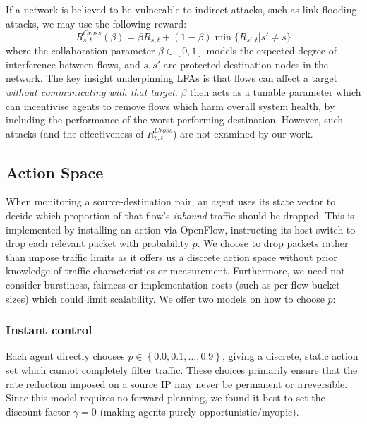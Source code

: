 \documentclass[10pt, times, comsoc]{IEEEtran}
\begin{document}
If a network is believed to be vulnerable to indirect attacks, such as link-flooding attacks, we may use the following reward:
\begin{equation}
	R_{s,t}^{\mathit{Cross}}(\beta) = \beta R_{s,t} + (1 - \beta) \min{\{R_{s',t} | s' \ne s\}} \label{eqn:lfa-reward}
\end{equation}
where the collaboration parameter $\beta \in [0,1]$ models the expected degree of interference between flows, and $s, s'$ are protected destination nodes in the network.
The key insight underpinning LFAs is that flows can affect a target \emph{without communicating with that target}.
$\beta$ then acts as a tunable parameter which can incentivise agents to remove flows which harm overall system health, by including the performance of the worst-performing destination.
However, such attacks (and the effectiveness of $R_{s,t}^{\mathit{Cross}}$) are not examined by our work.

\subsection{Action Space}
When monitoring a source-destination pair, an agent uses its state vector to decide which proportion of that flow's \emph{inbound} traffic should be dropped.
This is implemented by installing an action via OpenFlow, instructing its host switch to drop each relevant packet with probability $p$.
We choose to drop packets rather than impose traffic limits as it offers us a discrete action space without prior knowledge of traffic characteristics or measurement.
Furthermore, we need not consider burstiness, fairness or implementation costs (such as per-flow bucket sizes) which could limit scalability.
We offer two models on how to choose $p$:

\subsubsection{Instant control}
Each agent directly chooses $p \in \left\{ 0.0, 0.1, \ldots, 0.9 \right\}$, giving a discrete, static action set which cannot completely filter traffic.
These choices primarily ensure that the rate reduction imposed on a source IP may never be permanent or irreversible.
Since this model requires no forward planning, we found it best to set the discount factor $\gamma=0$ (making agents purely opportunistic/myopic).
\end{document}
